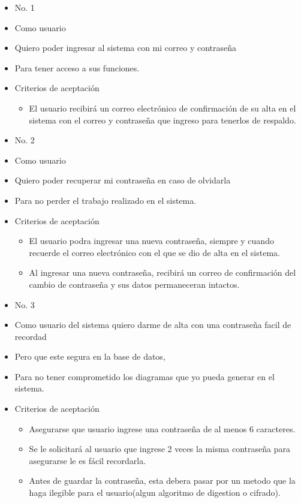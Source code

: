 \begin{itemize}
	\item No. 1
	\item Como usuario
	\item Quiero poder ingresar al sistema con mi correo y contraseña
	\item Para tener acceso a sus funciones.
	\item Criterios de aceptación
	\begin{itemize}
		\item El usuario recibirá un correo electrónico de confirmación de su alta en el sistema con el correo y contraseña que ingreso para tenerlos de respaldo.
	\end{itemize}
\end{itemize}

\begin{itemize}
	\item No. 2
	\item Como usuario
	\item Quiero poder recuperar mi contraseña en caso de olvidarla
	\item Para no perder el trabajo realizado en el sistema.
	\item Criterios de aceptación
	\begin{itemize}
		\item El usuario podra ingresar una nueva contraseña, siempre y cuando recuerde el correo electrónico con el que se dio de alta en el sistema.
		\item Al ingresar una nueva contraseña, recibirá un correo de confirmación del cambio de contraseña y sus datos permaneceran intactos.
	\end{itemize}
\end{itemize}

\begin{itemize}
	\item No. 3
	\item Como usuario del sistema quiero darme de alta con una contraseña facil de recordad
	\item Pero que este segura en la base de datos,
	\item Para no tener comprometido los diagramas que yo pueda generar en el sistema.

	\item Criterios de aceptación
	\begin{itemize}
		\item Asegurarse que usuario ingrese una contraseña de al menos 6 caracteres.
		\item Se le solicitará al usuario que ingrese 2 veces la misma contraseña para asegurarse le es fácil recordarla.
		\item Antes de guardar la contraseña, esta debera pasar por un metodo que la haga ilegible para el usuario(algun algoritmo de digestion o cifrado).
	\end{itemize}
\end{itemize}

